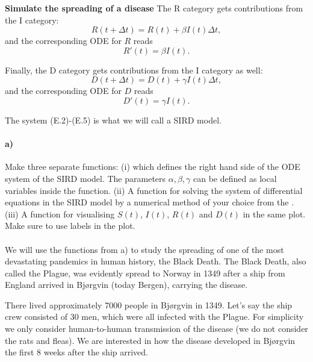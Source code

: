 \begin{Problem}{\textbf{Simulate the spreading of a disease}}
The R category gets contributions from the I category:
\begin{equation*}
   R(t + \Delta t) = R(t) + \beta I(t) \Delta t,
\end{equation*}
and the corresponding ODE for $R$ reads
\begin{equation} \label{eq:4}
R'(t) = \beta I(t).
\end{equation}

Finally, the D category gets contributions from the I category as well:
\begin{equation*}
  D(t + \Delta t) = D(t) + \gamma I(t) \Delta t,
\end{equation*}
and the corresponding ODE for $D$ reads
\begin{equation} \label{eq:5}
D'(t) = \gamma I (t).
\end{equation}

The system (E.2)-(E.5) is what we will call a SIRD model.

\paragraph{a)}
Make three separate functions: (i)  which defines the right hand side of the ODE system of the SIRD model. The parameters $\alpha, \beta, \gamma$ can be defined as local variables inside the function. (ii) A function  for solving the system of differential equations in the SIRD model by a numerical method of your choice from the . (iii) A function  for visualising $S(t)$, $I(t)$, $R(t)$ and $D(t)$ in the same plot. Make sure to use labels in the plot.

\paragraph{}
We will use the functions from a) to study the spreading of one of the most devastating pandemics in human history, the Black Death. The Black Death, also called the Plague, was evidently spread to Norway in 1349 after a ship from England arrived in Bjørgvin (today Bergen), carrying the disease.

There lived approximately 7000 people in Bjørgvin in 1349. %
Let's say the ship crew consisted of 30 men, which were all infected with the Plague. For simplicity we only consider human-to-human transmission of the disease (we do not consider the rats and fleas). We are interested in how the disease developed in Bjørgvin the first 8 weeks after the ship arrived.


\end{Problem}
